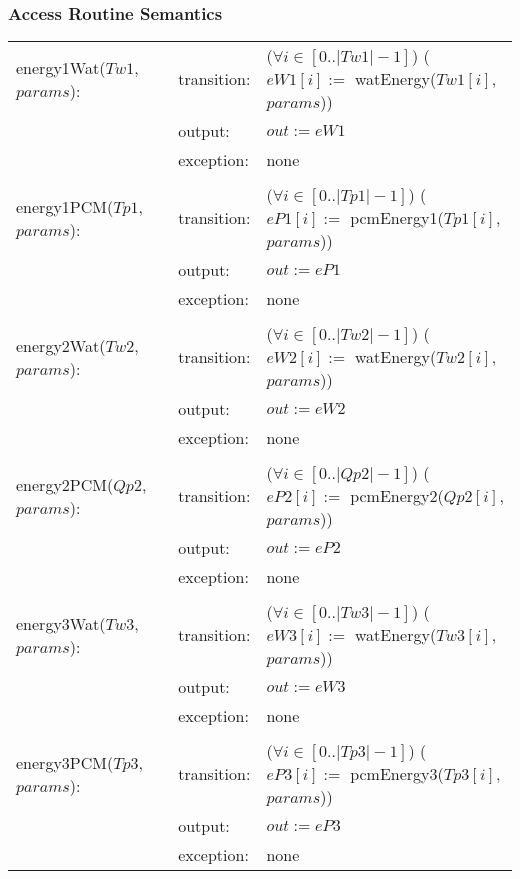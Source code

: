 \documentclass[12pt]{article}
\begin{document}
\subsubsection{Access Routine Semantics}
\begin{center}
\begin{tabular}{l l p{6cm}}
energy1Wat($Tw1$, $params$): & transition: & ($\forall i \in [0..|Tw1| - 1]$) ($eW1[i] :=$ watEnergy($Tw1[i]$, $params$)) \\
& output: & $out := eW1$ \\ 
& exception: & none \\ \\
energy1PCM($Tp1$, $params$): & transition: & ($\forall i \in [0..|Tp1| - 1]$) ($eP1[i]:=$ pcmEnergy1($Tp1[i]$, $params$)) \\
& output: & $out := eP1$ \\ 
& exception: & none \\ \\
energy2Wat($Tw2$, $params$): & transition: & ($\forall i \in [0..|Tw2| - 1]$) ($eW2[i] :=$ watEnergy($Tw2[i]$, $params$)) \\
& output: & $out := eW2$ \\ 
& exception: & none \\ \\
energy2PCM($Qp2$, $params$): & transition: & ($\forall i \in [0..|Qp2| - 1]$) ($eP2[i] :=$ pcmEnergy2($Qp2[i]$, $params$)) \\
& output: & $out := eP2$ \\ 
& exception: & none \\ \\
energy3Wat($Tw3$, $params$): & transition: & ($\forall i \in [0..|Tw3| - 1]$) ($eW3[i] :=$ watEnergy($Tw3[i]$, $params$)) \\
& output: & $out := eW3$ \\ 
& exception: & none \\ \\
energy3PCM($Tp3$, $params$): & transition: & ($\forall i \in [0..|Tp3| - 1]$) ($eP3[i] :=$ pcmEnergy3($Tp3[i]$, $params$)) \\
& output: & $out := eP3$ \\
& exception: & none \\
\end{tabular}
\end{center}
\end{document}
